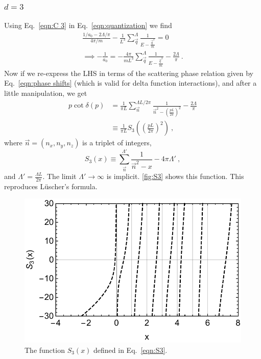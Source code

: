 \documentclass[11pt]{article}
\begin{document}
\subsubsection{$d=3$}
Using Eq.~\eqref{eqn:C 3} in Eq.~\eqref{eqn:quantization} we find
\begin{multline}
\frac{1/a_0-2\Lambda/\pi}{4\pi/m}-\frac{1}{L^3}\sum_{\vec{q}}^\Lambda \frac { 1 } { E - \frac{\vec{q}^2}{m} }=0\\
\implies-\frac{1}{a_0}=-\frac{4\pi}{mL^3}\sum_{\vec{q}}^\Lambda \frac { 1 } { E - \frac{\vec{q}^2}{m} }-\frac{2\Lambda}{\pi}\ .
\end{multline}
Now if we re-express the LHS in terms of the scattering phase relation given by Eq.~\eqref{eqn:phase shifts} (which is valid for delta function interactions), and after a little manipulation, we get
\begin{align}
p\cot \delta(p)&=\frac{1}{\pi L}\sum_{\vec{n}}^{\Lambda L/2\pi} \frac { 1 } { \vec{n}^2 -\left(\frac{pL}{2\pi}\right)^2}-\frac{2\Lambda}{\pi}\\
&\equiv \frac{1}{\pi L}S_3\left(\left(\frac{pL}{2\pi}\right)^2\right)\ ,
\end{align}
where $\vec{n}=(n_x,n_y,n_z)$ is a triplet of integers, 
\begin{equation}\label{eqn:S3}
S_3(x)\equiv\sum_{\vec{n}}^{\Lambda'} \frac { 1 } { \vec{n}^2 -x}-4\pi\Lambda'\ ,
\end{equation}
and $\Lambda'=\frac{\Lambda L}{2\pi}$.  The limit $\Lambda'\to\infty$ is implicit.  \autoref{fig:S3} shows this function. This reproduces L\"uscher's formula. 
\begin{figure}
\center
\includegraphics[width=.8\columnwidth]{figure/S3.pdf}
\caption{The function $S_3(x)$ defined in Eq.~\eqref{eqn:S3}.\label{fig:S3}}
\end{figure}
\end{document}
